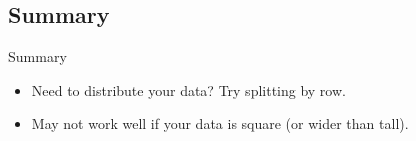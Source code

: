 \subsection{Summary}
\makesubcontentsslidessec


\begin{frame}[fragile]
  \begin{block}{Summary}\pause
    \begin{itemize}
      \item Need to distribute your data? Try splitting by row.
      \item May not work well if your data is square (or wider than tall).
    \end{itemize}
\end{block}
\end{frame}